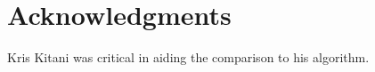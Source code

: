 \documentclass[letterpaper,10pt,conference]{ieeeconf}
\newtheorem{thm}{Theorem}
\begin{document}
\section*{Acknowledgments}
Kris Kitani was critical in aiding the comparison to his algorithm.

%
%
%
\end{document}
